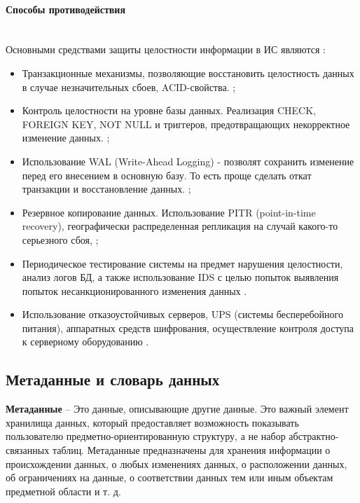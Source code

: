 \paragraph{Способы противодействия} ~\\

Основными средствами защиты целостности информации в ИС являются \autocite{Pirogov2009}:
\begin{itemize}
    \item Транзакционные механизмы, позволяющие восстановить целостность данных в случае незначительных сбоев, ACID-свойства. \autocite{worksol1, DBtest};
    \item Контроль целостности на уровне базы данных. Реализация CHECK, FOREIGN KEY, NOT NULL и триггеров, предотвращающих некорректное изменение данных. \autocite{flenovinfo};
    \item Использование WAL (Write-Ahead Logging) - позволят сохранить изменение перед его внесением в основную базу. То есть проще сделать откат транзакции и восстановление данных. \autocite{WALintro};
    \item Резервное копирование данных. Использование PITR (point-in-time recovery), географически распределенная репликация на случай какого-то серьезного сбоя, \autocite{PITRintro};
    \item Периодическое тестирование системы на предмет нарушения целостности, анализ логов БД, а также использование IDS с целью попыток выявления попыток несанкционированного изменения данных \autocite{DBtest}.
    \item Использование отказоустойчивых серверов, UPS (системы бесперебойного питания), аппаратных средств шифрования, осуществление контроля доступа к серверному оборудованию \autocite{tolerance1, tolerance2}.

\end{itemize}

\subsection{Метаданные и словарь данных}

\begin{grayquote}
	\textbf{Метаданные} -- Это данные, описывающие другие данные. Это важный элемент хранилища данных, который предоставляет возможность показывать пользователю предметно-ориентированную структуру, а не набор абстрактно-связанных таблиц. Метаданные предназначены для хранения информации о происхождении данных, о любых изменениях данных, о расположении данных, об ограничениях на данные, о соответствии данных тем или иным объектам предметной области и т. д. \autocite{Pirogov2009}
\end{grayquote}

